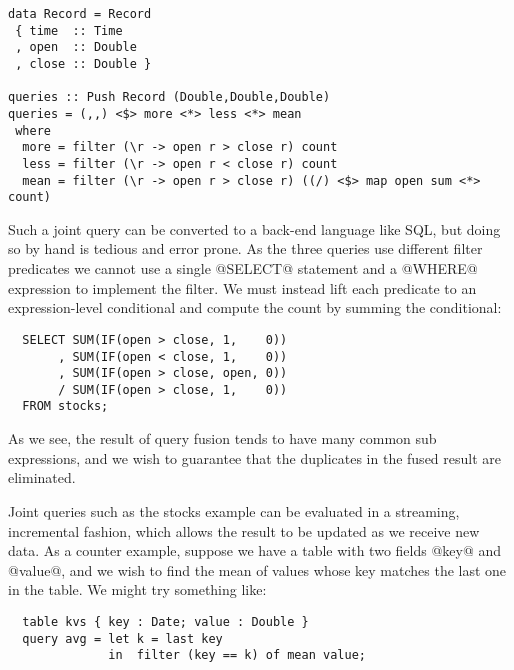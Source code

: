 \begin{lstlisting}
data Record = Record
 { time  :: Time
 , open  :: Double
 , close :: Double }

queries :: Push Record (Double,Double,Double)
queries = (,,) <$> more <*> less <*> mean
 where
  more = filter (\r -> open r > close r) count
  less = filter (\r -> open r < close r) count
  mean = filter (\r -> open r > close r) ((/) <$> map open sum <*> count)
\end{lstlisting}

Such a joint query can be converted to a back-end language like SQL, but doing so by hand is tedious and error prone. As the three queries use different filter predicates we cannot use a single @SELECT@ statement and a @WHERE@ expression to implement the filter. We must instead lift each predicate to an expression-level conditional and compute the count by summing the conditional:
\begin{lstlisting}
  SELECT SUM(IF(open > close, 1,    0))
       , SUM(IF(open < close, 1,    0))
       , SUM(IF(open > close, open, 0))
       / SUM(IF(open > close, 1,    0))
  FROM stocks;
\end{lstlisting}

As we see, the result of query fusion tends to have many common sub expressions, and we wish to guarantee that the duplicates in the fused result are eliminated.

Joint queries such as the stocks example can be evaluated in a streaming, incremental fashion, which allows the result to be updated as we receive new data. As a counter example, suppose we have a table with two fields @key@ and @value@, and we wish to find the mean of values whose key matches the last one in the table. We might try something like:
\begin{lstlisting}
  table kvs { key : Date; value : Double }
  query avg = let k = last key
              in  filter (key == k) of mean value;
\end{lstlisting}

